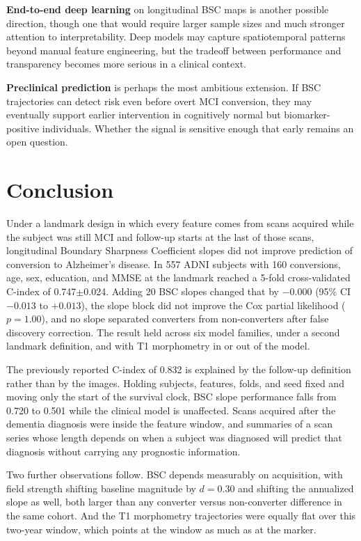 \documentclass[blue]{ludusofficial}  %
\begin{document}
\textbf{End-to-end deep learning} on longitudinal BSC maps is another possible direction, though one that would require larger sample sizes and much stronger attention to interpretability. Deep models may capture spatiotemporal patterns beyond manual feature engineering, but the tradeoff between performance and transparency becomes more serious in a clinical context.

\textbf{Preclinical prediction} is perhaps the most ambitious extension. If BSC trajectories can detect risk even before overt MCI conversion, they may eventually support earlier intervention in cognitively normal but biomarker-positive individuals. Whether the signal is sensitive enough that early remains an open question.

\section{Conclusion}

Under a landmark design in which every feature comes from scans acquired while the subject was still MCI and follow-up starts at the last of those scans, longitudinal Boundary Sharpness Coefficient slopes did not improve prediction of conversion to Alzheimer's disease. In 557 ADNI subjects with 160 conversions, age, sex, education, and MMSE at the landmark reached a 5-fold cross-validated C-index of 0.747$\pm$0.024. Adding 20 BSC slopes changed that by $-0.000$ (95\% CI $-0.013$ to $+0.013$), the slope block did not improve the Cox partial likelihood ($p = 1.00$), and no slope separated converters from non-converters after false discovery correction. The result held across six model families, under a second landmark definition, and with T1 morphometry in or out of the model.

The previously reported C-index of 0.832 is explained by the follow-up definition rather than by the images. Holding subjects, features, folds, and seed fixed and moving only the start of the survival clock, BSC slope performance falls from 0.720 to 0.501 while the clinical model is unaffected. Scans acquired after the dementia diagnosis were inside the feature window, and summaries of a scan series whose length depends on when a subject was diagnosed will predict that diagnosis without carrying any prognostic information.

Two further observations follow. BSC depends measurably on acquisition, with field strength shifting baseline magnitude by $d=0.30$ and shifting the annualized slope as well, both larger than any converter versus non-converter difference in the same cohort. And the T1 morphometry trajectories were equally flat over this two-year window, which points at the window as much as at the marker.
\end{document}
